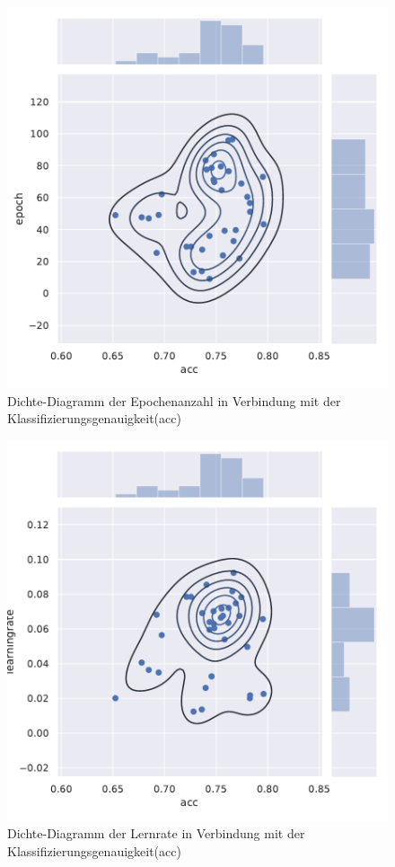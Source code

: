 \begin{figure}[H]
  \centering  
  \includegraphics[scale=0.5]{anhang/GA_250_cifar10_False_big_jointplot_epoch.pdf}
  \caption{Dichte-Diagramm der Epochenanzahl in Verbindung mit der Klassifizierungsgenauigkeit(acc)}
\end{figure}

\begin{figure}[H]
  \centering  
  \includegraphics[scale=0.5]{anhang/GA_250_cifar10_False_big_jointplot_learningrate.pdf}
  \caption{Dichte-Diagramm der Lernrate in Verbindung mit der Klassifizierungsgenauigkeit(acc)}
\end{figure}

